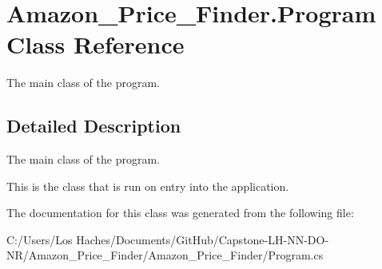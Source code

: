 \hypertarget{class_amazon___price___finder_1_1_program}{\section{Amazon\-\_\-\-Price\-\_\-\-Finder.\-Program Class Reference}
\label{class_amazon___price___finder_1_1_program}
}


The main class of the program.  




\subsection{Detailed Description}
The main class of the program. 

This is the class that is run on entry into the application. 

The documentation for this class was generated from the following file\-:\begin{DoxyCompactItemize}
\item 
C\-:/\-Users/\-Los Haches/\-Documents/\-Git\-Hub/\-Capstone-\/\-L\-H-\/\-N\-N-\/\-D\-O-\/\-N\-R/\-Amazon\-\_\-\-Price\-\_\-\-Finder/\-Amazon\-\_\-\-Price\-\_\-\-Finder/Program.\-cs\end{DoxyCompactItemize}
